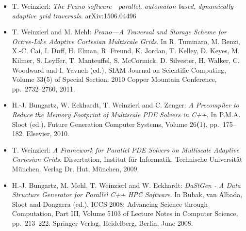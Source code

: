 \begin{itemize}
  \item T. Weinzierl: 
  {\em The {P}eano software---parallel,
   automaton-based, dynamically adaptive grid traversals}.
  arXiv:1506.04496
  \item 
  T. Weinzierl and M. Mehl: {\em Peano---A Traversal and Storage Scheme for
Octree-Like Adaptive Cartesian Multiscale Grids}.
In R. Tuminaro, M. Benzi, X.-C. Cai, I. Duff, H. Elman, R. Freund, K. Jordan, T.
Kelley, D. Keyes, M. Kilmer, S. Leyffer, T. Manteuffel, S. McCormick, D.
Silvester, H. Walker, C. Woodward and I. Yavneh (ed.), SIAM Journal on
Scientific Computing, Volume 33{\textbf(5)} of Special Section: 2010 Copper Mountain
Conference, pp.~2732--2760, 2011.
  \item 
H.-J. Bungartz, W. Eckhardt, T. Weinzierl and C. Zenger: {\em A Precompiler to
Reduce the Memory Footprint of Multiscale PDE Solvers in C++}.
In P.M.A. Sloot (ed.), Future Generation Computer Systems, Volume 26{\textbf (1)},
pp.~175--182. Elsevier, 2010.
  \item 
T. Weinzierl: {\em A Framework for Parallel PDE Solvers on Multiscale Adaptive
Cartesian Grids}.
Dissertation, Institut f\"ur Informatik, Technische Universit\"at M\"unchen. Verlag Dr. Hut, M\"unchen, 2009.
    \item 
H.-J. Bungartz, M. Mehl, T. Weinzierl and W. Eckhardt: {\em DaStGen - A Data
Structure Generator for Parallel C++ HPC Software}.
In Bubak, van Albada, Sloot and Dongarra (ed.), ICCS 2008: Advancing Science
through Computation, Part III, Volume 5103 of Lecture Notes in Computer Science,
pp.~213--222. Springer-Verlag, Heidelberg, Berlin, June 2008.
\end{itemize}
